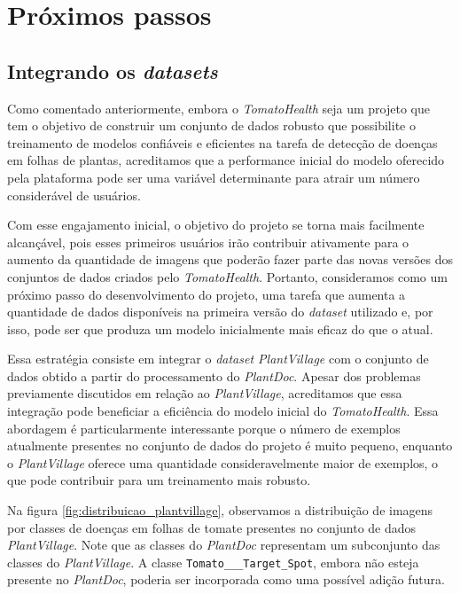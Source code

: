\chapter{Próximos passos}
\label{sec:próximos passos}
\section{Integrando os \emph{datasets}}
\label{sec:integrando-resultados}
Como comentado anteriormente, embora o \emph{TomatoHealth} seja um projeto que tem o objetivo de construir um conjunto de dados robusto que possibilite o treinamento de modelos confiáveis e eficientes na tarefa de detecção de doenças em folhas de plantas, acreditamos que a performance inicial do modelo oferecido pela plataforma pode ser uma variável determinante para atrair um número considerável de usuários.

Com esse engajamento inicial, o objetivo do projeto se torna mais facilmente alcançável, pois esses primeiros usuários irão contribuir ativamente para o aumento da quantidade de imagens que poderão fazer parte das novas versões dos conjuntos de dados criados pelo \emph{TomatoHealth}. Portanto, consideramos como um próximo passo do desenvolvimento do projeto, uma tarefa que aumenta a quantidade de dados disponíveis na primeira versão do \emph{dataset} utilizado e, por isso, pode ser que produza um modelo inicialmente mais eficaz do que o atual.

Essa estratégia consiste em integrar o \emph{dataset PlantVillage} com o conjunto de dados obtido a partir do processamento do \emph{PlantDoc}. Apesar dos problemas previamente discutidos em relação ao \emph{PlantVillage}, acreditamos que essa integração pode beneficiar a eficiência do modelo inicial do \emph{TomatoHealth}. Essa abordagem é particularmente interessante porque o número de exemplos atualmente presentes no conjunto de dados do projeto é muito pequeno, enquanto o \emph{PlantVillage} oferece uma quantidade consideravelmente maior de exemplos, o que pode contribuir para um treinamento mais robusto.

Na figura \ref{fig:distribuicao_plantvillage}, observamos a distribuição de imagens por classes de doenças em folhas de tomate presentes no conjunto de dados \emph{PlantVillage}. Note que as classes do \emph{PlantDoc} representam um subconjunto das classes do \emph{PlantVillage}. A classe \texttt{Tomato\_\_\_Target\_Spot}, embora não esteja presente no \emph{PlantDoc}, poderia ser incorporada como uma possível adição futura.

